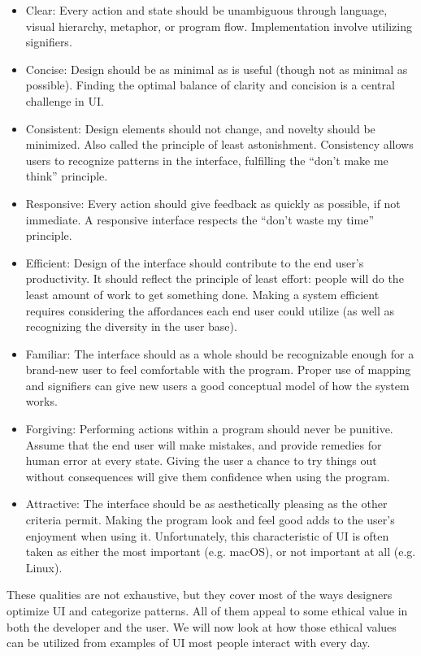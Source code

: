 \documentclass[12pt, oneside]{article}
\begin{document}
\begin{itemize}
\raggedright
    \item Clear: Every action and state should be unambiguous through language, visual hierarchy, metaphor, or program flow. Implementation involve utilizing signifiers.
    \item Concise: Design should be as minimal as is useful (though not as minimal as possible). Finding the optimal balance of clarity and concision is a central challenge in UI.
    \item Consistent: Design elements should not change, and novelty should be minimized. Also called the principle of least astonishment. Consistency allows users to recognize patterns in the interface, fulfilling the ``don't make me think'' principle.
    \item Responsive: Every action should give feedback as quickly as possible, if not immediate. A responsive interface respects the ``don't waste my time'' principle.
    \item Efficient: Design of the interface should contribute to the end user's productivity. It should reflect the principle of least effort: people will do the least amount of work to get something done. Making a system efficient requires considering the affordances each end user could utilize (as well as recognizing the diversity in the user base).
    \item Familiar: The interface should as a whole should be recognizable enough for a brand-new user to feel comfortable with the program. Proper use of mapping and signifiers can give new users a good conceptual model of how the system works.
    \item Forgiving: Performing actions within a program should never be punitive. Assume that the end user will make mistakes, and provide remedies for human error at every state. Giving the user a chance to try things out without consequences will give them confidence when using the program.
    \item Attractive: The interface should be as aesthetically pleasing as the other criteria permit. Making the program look and feel good adds to the user's enjoyment when using it. Unfortunately, this characteristic of UI is often taken as either the most important (e.g. macOS), or not important at all (e.g. Linux).
\end{itemize}

These qualities are not exhaustive, but they cover most of the ways designers optimize UI and categorize patterns. All of them appeal to some ethical value in both the developer and the user. We will now look at how those ethical values can be utilized from examples of UI most people interact with every day.
\end{document}
